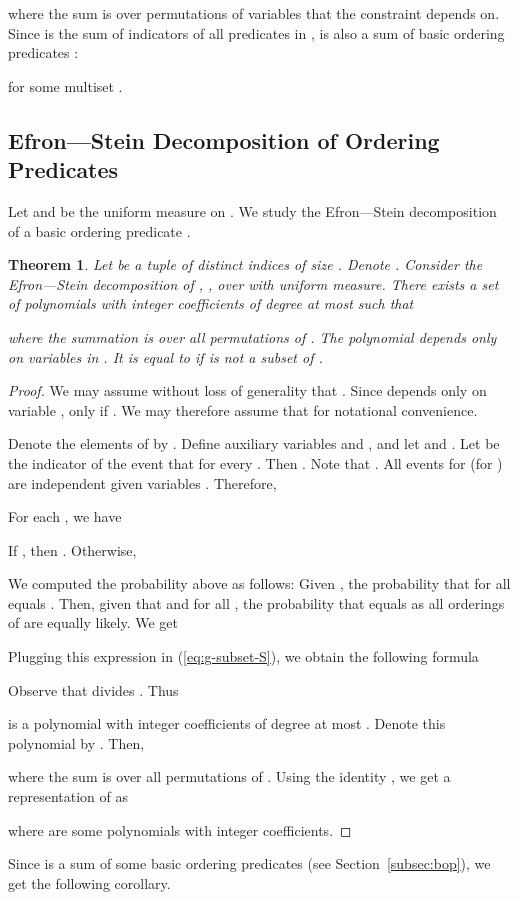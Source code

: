 \documentclass[11pt]{article}
\newif\ifconf
\newtheorem{theorem}{Theorem}
\begin{document}
where the sum is over permutations of variables that
the constraint  depends on.
Since  is the sum of indicators of all
predicates  in ,  is also a sum
of basic ordering predicates :

 for some multiset .

\subsection{Efron---Stein Decomposition of Ordering Predicates}
Let  and  be the uniform measure on . We study the Efron---Stein decomposition
of a basic ordering predicate .

\ifconf\pagebreak\fi
\begin{theorem}\label{thm:ES-ordering-predicate}
Let  be a tuple of distinct indices of size . Denote . Consider the Efron---Stein decomposition of , , over  with uniform measure.
There exists a set of polynomials  with integer coefficients of degree at most  such that

where the summation is over all permutations  of . The polynomial  depends only on variables in . It is equal to  if
 is not a subset of .
\end{theorem}
\begin{proof}
We may assume without loss of generality that
.
Since  depends only on
variable ,  only if . We may therefore assume that 
for notational convenience.

Denote the elements of  by .
Define auxiliary variables
 and , and let  and .
Let  be the indicator of the event that
 for every .
Then .  Note that
.
All events for  (for )
are independent given variables . Therefore,

For each , we have

If , then . Otherwise,

We computed the probability above as follows: Given , the probability that
 for all 
equals . Then, given that 
and  for all , the probability that
 equals  as all orderings
of  are equally likely.
We get

Plugging this expression in (\ref{eq:g-subset-S}), we obtain the following formula

Observe that  divides
.
Thus

is a polynomial with integer coefficients of degree at most  . Denote this polynomial by .
Then,

where the sum is over all permutations  of .
Using the identity
,
we get a representation of  as

where  are some polynomials with integer coefficients.
\end{proof}
Since  is a sum of some basic ordering predicates (see Section~\ref{subsec:bop}), we get the following corollary.
\end{document}
